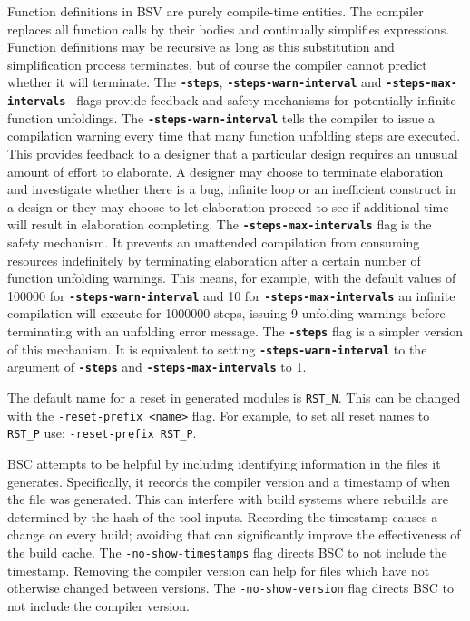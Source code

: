 \documentclass{article}
\newcommand{\te}[1]{\texttt{#1}}
\begin{document}
Function definitions in BSV are purely compile-time entities.  The
compiler replaces all function calls by their bodies and continually
simplifies expressions. Function definitions may be recursive as long
as this substitution and simplification process terminates, but of
course the compiler cannot predict whether it will terminate. The
{\bf\tt -steps}, {\bf\tt -steps-warn-interval} and {\bf\tt -steps-max-intervals }
flags provide feedback and safety mechanisms for potentially infinite
function unfoldings. The {\bf\tt -steps-warn-interval} tells the compiler to
issue a compilation warning every time that many function unfolding steps are
executed. This provides feedback to a designer that a particular design requires
an unusual amount of effort to elaborate. A designer may choose to terminate
elaboration and investigate whether there is a bug, infinite loop or an
inefficient construct in a design or they may choose to let elaboration proceed
to see if additional time will result in elaboration completing. The
{\bf\tt -steps-max-intervals} flag is the safety mechanism. It prevents an
unattended compilation from consuming resources indefinitely by terminating
elaboration after a certain number of function unfolding warnings. This means, for example,
with the default values of 100000 for {\bf\tt -steps-warn-interval} and
10 for {\bf\tt -steps-max-intervals} an infinite compilation will execute for
1000000 steps, issuing 9 unfolding warnings before terminating with an unfolding
error message. The {\bf\tt -steps} flag  is a simpler version of this mechanism. It is
equivalent to setting  {\bf\tt -steps-warn-interval} to the argument of {\bf\tt -steps} and
{\bf\tt -steps-max-intervals} to 1.

The default name for a reset in generated modules is \te{RST\_N}.
This can be changed with the \te{-reset-prefix <name>} flag.  For
example, to set all reset names to \te{RST\_P} use:
\te{-reset-prefix RST\_P}.

BSC attempts to be helpful by including identifying information in the
files it generates.  Specifically, it records the compiler version and a
timestamp of when the file was generated.  This can interfere with
build systems where rebuilds are determined by the hash of the tool
inputs.  Recording the timestamp causes a change on every build;
avoiding that can significantly improve the effectiveness of the build
cache.  The \te{-no-show-timestamps} flag directs BSC to not include
the timestamp.  Removing the compiler version can help for files which
have not otherwise changed between versions.  The \te{-no-show-version}
flag directs BSC to not include the compiler version.
\end{document}

